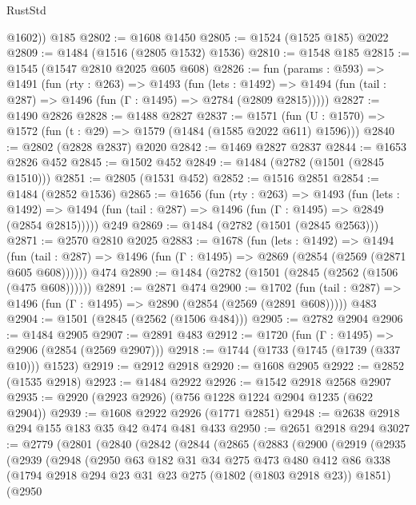 \begin{lexlean}{RustStd}
\begin{coremodule}
        @1602))
    @185
@2802 := @1608 @1450
@2805 := @1524 (@1525 @185) @2022
@2809 := @1484 (@1516 (@2805 @1532) @1536)
@2810 := @1548 @185
@2815 := @1545 (@1547 @2810 @2025 @605 @608)
@2826 := fun (params : @593) =>
  @1491
    (fun (rty : @263) =>
    @1493
      (fun (lets : @1492) =>
      @1494 (fun (tail : @287) => @1496 (fun (Γ : @1495) => @2784 (@2809 @2815)))))
@2827 := @1490 @2826
@2828 := @1488 @2827
@2837 := @1571 (fun (U : @1570) => @1572 (fun (t : @29) => @1579 (@1484 (@1585 @2022 @611) @1596)))
@2840 := @2802 (@2828 @2837) @2020
@2842 := @1469 @2827 @2837
@2844 := @1653 @2826 @452
@2845 := @1502 @452
@2849 := @1484 (@2782 (@1501 (@2845 @1510)))
@2851 := @2805 (@1531 @452)
@2852 := @1516 @2851
@2854 := @1484 (@2852 @1536)
@2865 := @1656
    (fun (rty : @263) =>
    @1493
      (fun (lets : @1492) =>
      @1494 (fun (tail : @287) => @1496 (fun (Γ : @1495) => @2849 (@2854 @2815)))))
    @249
@2869 := @1484 (@2782 (@1501 (@2845 @2563)))
@2871 := @2570 @2810 @2025
@2883 := @1678
    (fun (lets : @1492) =>
    @1494 (fun (tail : @287) => @1496 (fun (Γ : @1495) => @2869 (@2854 (@2569 (@2871 @605 @608))))))
    @474
@2890 := @1484 (@2782 (@1501 (@2845 (@2562 (@1506 (@475 @608))))))
@2891 := @2871 @474
@2900 := @1702
    (fun (tail : @287) => @1496 (fun (Γ : @1495) => @2890 (@2854 (@2569 (@2891 @608)))))
    @483
@2904 := @1501 (@2845 (@2562 (@1506 @484)))
@2905 := @2782 @2904
@2906 := @1484 @2905
@2907 := @2891 @483
@2912 := @1720 (fun (Γ : @1495) => @2906 (@2854 (@2569 @2907)))
@2918 := @1744 (@1733 (@1745 (@1739 (@337 @10))) @1523)
@2919 := @2912 @2918
@2920 := @1608 @2905
@2922 := @2852 (@1535 @2918)
@2923 := @1484 @2922
@2926 := @1542 @2918 @2568 @2907
@2935 := @2920 (@2923 @2926) (@756 @1228 @1224 @2904 @1235 (@622 @2904))
@2939 := @1608 @2922 @2926 (@1771 @2851)
@2948 := @2638 @2918 @294 @155 @183 @35 @42 @474 @481 @433
@2950 := @2651 @2918 @294
@3027 := @2779
    (@2801
      (@2840
        (@2842
          (@2844
            (@2865
              (@2883
                (@2900
                  (@2919
                    (@2935
                      (@2939
                        (@2948
                          (@2950
                            @63
                            @182
                            @31
                            @34
                            @275
                            @473
                            @480
                            @412
                            @86
                            @338
                            (@1794 @2918 @294 @23 @31 @23 @275 (@1802 (@1803 @2918 @23)) @1851)
                            (@2950

\end{coremodule}
\end{lexlean}
